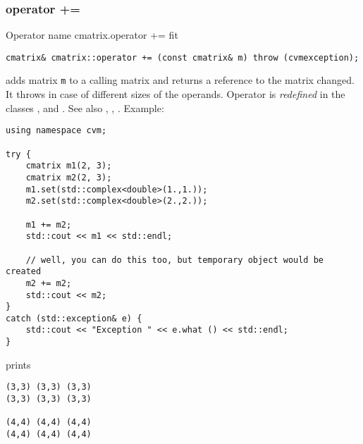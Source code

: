 \subsubsection{operator +=}
Operator%
\pdfdest name {cmatrix.operator +=} fit
\begin{verbatim}
cmatrix& cmatrix::operator += (const cmatrix& m) throw (cvmexception);
\end{verbatim}
adds  matrix \verb"m" to a calling matrix 
and returns a reference to
the matrix changed.
It throws  
in case of different sizes of the operands.
Operator is \emph{redefined} in the classes
,  
and .
See also ,
,
.
Example:
\begin{Verbatim}
using namespace cvm;

try {
    cmatrix m1(2, 3);
    cmatrix m2(2, 3);
    m1.set(std::complex<double>(1.,1.));
    m2.set(std::complex<double>(2.,2.));

    m1 += m2;
    std::cout << m1 << std::endl;

    // well, you can do this too, but temporary object would be created
    m2 += m2; 
    std::cout << m2;
}
catch (std::exception& e) {
    std::cout << "Exception " << e.what () << std::endl;
}
\end{Verbatim}
prints
\begin{Verbatim}
(3,3) (3,3) (3,3)
(3,3) (3,3) (3,3)

(4,4) (4,4) (4,4)
(4,4) (4,4) (4,4)
\end{Verbatim}
\newpage



